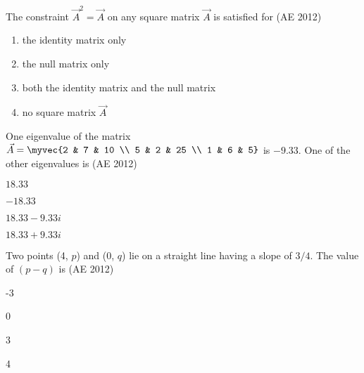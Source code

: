 \item The constraint $\vec{A}^2 = \vec{A}$ on any square matrix $\vec{A}$ is satisfied for
\hfill(AE 2012)
\begin{enumerate}
\item the identity matrix only
\item the null matrix only
\item both the identity matrix and the null matrix
\item no square matrix $\vec{A}$
\end{enumerate}
\item One eigenvalue of the matrix $\vec{A} = \myvec{2 & 7 & 10 \\ 5 & 2 & 25 \\ 1 & 6 & 5}$ is $-9.33$. One of the other eigenvalues is
\hfill(AE 2012)
\begin{enumerate}
\begin{multicols}{4}
\item $18.33$
\item $-18.33$
\item $18.33 - 9.33i$
\item $18.33 + 9.33i$
\end{multicols}
\end{enumerate}
    \item Two points (4, $p$) and (0, $q$) lie on a straight line having a slope of $3/4$. The value of $(p - q)$ is  
    \hfill(AE 2012)
    \begin{enumerate}
    \begin{multicols}{4}
        \item -3
        \item 0
        \item 3
        \item 4
        \end{multicols}
    \end{enumerate}
